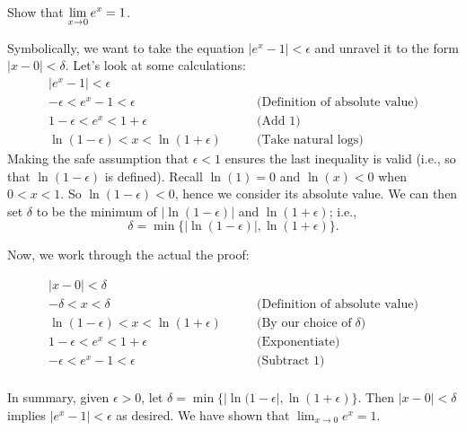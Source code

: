 \begin{example} \label{Ex:1.4.Eg3}
Show that $\displaystyle \lim_{x \to 0} e^x = 1 $.

\solution Symbolically, we want to take the equation $|e^x - 1| < \epsilon$ and unravel it to the form $|x-0| < \delta$.  Let's look at some calculations:
\begin{eqnarray*}
|e^x - 1| < \epsilon&\\
-\epsilon < e^x - 1 < \epsilon& \qquad \textrm{(Definition of absolute value)}\\
1-\epsilon < e^x < 1+\epsilon & \qquad \textrm{(Add 1)}\\
\ln(1-\epsilon) < x < \ln(1+\epsilon) & \qquad \textrm{(Take natural logs)}
\end{eqnarray*}
Making the safe assumption that $\epsilon<1$ ensures the last inequality is valid (i.e., so that $\ln (1-\epsilon)$ is defined). Recall $\ln(1)= 0$ and $\ln(x)<0$ when $0<x<1$. So $\ln (1-\epsilon) <0$, hence we consider its absolute value. We can then set $\delta$ to be the minimum of $|\ln(1-\epsilon)|$ and $\ln(1+\epsilon)$; i.e.,  
\[ \delta = \min\{|\ln(1-\epsilon)|, \ln(1+\epsilon)\}. \]


Now, we work through the actual the proof:

\begin{eqnarray*}
|x - 0|<\delta\\
-\delta < x < \delta& \qquad \textrm{(Definition of absolute value)}\\
\ln(1-\epsilon) < x < \ln(1+\epsilon) & \qquad \textrm{(By our choice of}\; \delta)\\
1-\epsilon < e^x < 1+\epsilon & \qquad \textrm{(Exponentiate)}\\
-\epsilon < e^x - 1 < \epsilon & \qquad \textrm{(Subtract 1)}\\
\end{eqnarray*}

In summary, given $\epsilon > 0$, let $\delta = \min\{|\ln(1-\epsilon |, \ln(1+\epsilon)\}$. Then $|x - 0| < \delta$ implies $|e^x - 1|< \epsilon$ as desired.  We have shown that $\displaystyle \lim_{x\rightarrow 0} e^x = 1 $.
\end{example}